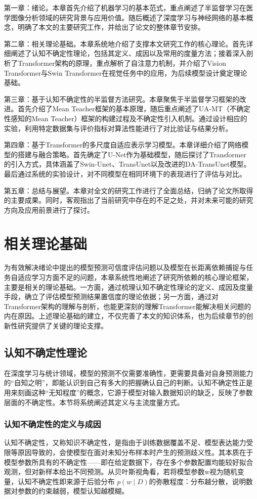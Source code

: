 \documentclass[twoside,openright]{xduugthesis}
\begin{document}
第一章：绪论。本章首先介绍了机器学习的基本范式，重点阐述了半监督学习在医学图像分析领域的研究背景与应用价值。随后概述了深度学习与神经网络的基本概念，明确了本文的主要研究工作，并给出了论文的整体章节安排。

第二章：相关理论基础。本章系统地介绍了支撑本文研究工作的核心理论。首先详细阐述了认知不确定性理论，包括其定义、成因以及常用的度量方法；接着深入剖析了Transformer架构的原理，重点解析了自注意力机制，并介绍了Vision Transformer与Swin Transformer在视觉任务中的应用，为后续模型设计奠定理论基础。

第三章：基于认知不确定性的半监督方法研究。本章聚焦于半监督学习框架的改进。首先介绍了Mean Teacher框架的基本原理，随后重点阐述了UA-MT（不确定性感知的Mean Teacher）框架的构建过程及不确定性引入机制。通过设计相应的实验，利用特定数据集与评价指标对算法性能进行了对比验证与结果分析。

第四章：基于Transformer的多尺度自适应表示学习模型。本章详细介绍了网络模型的搭建与融合策略。首先确定了U-Net作为基础模型，随后探讨了Transformer的引入方式，具体涵盖了Swin-Unet、TransUnet以及改进的DA-TransUnet模型。最后通过系统的实验设计，对不同模型在相同环境下的表现进行了评估与对比。

第五章：总结与展望。本章对全文的研究工作进行了全面总结，归纳了论文所取得的主要成果。同时，客观指出了当前研究中存在的不足之处，并对未来可能的研究方向及应用前景进行了探讨。

\chapter{相关理论基础}
为有效解决绪论中提出的模型预测可信度评估问题以及模型在长距离依赖捕捉与任务自适应学习方面不足的问题，本章系统性地阐述了研究所依赖的核心理论框架，主要是相关的理论基础。一方面，通过梳理认知不确定性理论的定义、成因及度量手段，确立了评估模型预测结果置信度的理论依据；另一方面，通过对Transformer架构的理解与剖析，也能更深刻的理解Transformer能解决相关问题的内在原因。上述理论基础的建立，不仅完善了本文的知识体系，也为后续章节的创新性研究提供了关键的理论支撑。

\section{认知不确定性理论}
在深度学习与统计领域，模型的预测不仅需要准确性，更需要具备对自身预测能力的“自知之明”，即能认识到自己有多大的把握确认自己的判断。认知不确定性正是用来刻画这种“无知程度”的概念，它源于模型对输入数据知识的缺乏，反映了参数层面的不确定性。本节将系统阐述其定义与主流度量方式。

\subsection{认知不确定性的定义与成因}
认知不确定性，又称知识不确定性，是指由于训练数据覆盖不足、模型表达能力受限等原因导致的，会使模型在面对未知分布样本时产生的预测歧义性。其本质在于模型参数所具有的不确定性——即在给定数据下，存在多个参数配置均能较好拟合观测，但对新样本给出不同预测。从贝叶斯视角看，若将模型参数w视为随机变量，认知不确定性即来源于后验分布 $p(w\mid D)$的弥散程度：分布越分散，说明数据对参数的约束越弱，模型认知越模糊。
\end{document}
